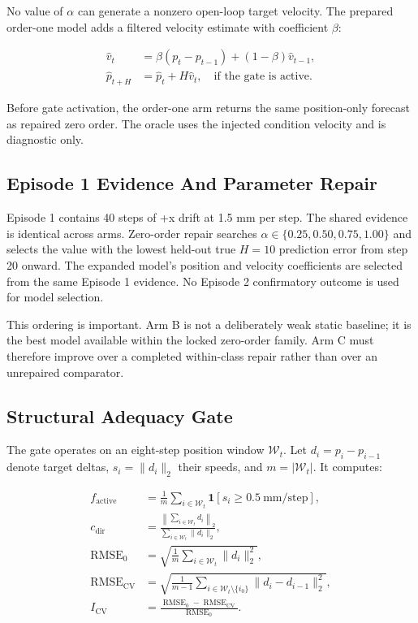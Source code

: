 \documentclass[10pt]{article}
\begin{document}
No value of \(\alpha\) can generate a nonzero open-loop target velocity. The prepared order-one model adds a filtered velocity estimate with coefficient \(\beta\):

\begin{align*}
\hat v_t &= \beta\left(p_t-p_{t-1}\right)
  +(1-\beta)\hat v_{t-1}, \\
\hat p_{t+H} &= \hat p_t + H\hat v_t,
  \quad \text{if the gate is active}.
\end{align*}

Before gate activation, the order-one arm returns the same position-only forecast as repaired zero order. The oracle uses the injected condition velocity and is diagnostic only.

\subsection{Episode 1 Evidence And Parameter Repair}

Episode 1 contains 40 steps of +x drift at 1.5 mm per step. The shared evidence is identical across arms. Zero-order repair searches \(\alpha \in \{0.25, 0.50, 0.75, 1.00\}\) and selects the value with the lowest held-out true \(H=10\) prediction error from step 20 onward. The expanded model's position and velocity coefficients are selected from the same Episode 1 evidence. No Episode 2 confirmatory outcome is used for model selection.

This ordering is important. Arm B is not a deliberately weak static baseline; it is the best model available within the locked zero-order family. Arm C must therefore improve over a completed within-class repair rather than over an unrepaired comparator.

\subsection{Structural Adequacy Gate}

The gate operates on an eight-step position window \(\mathcal{W}_t\). Let \(d_i=p_i-p_{i-1}\) denote target deltas, \(s_i=\lVert d_i\rVert_2\) their speeds, and \(m=\lvert\mathcal{W}_t\rvert\). It computes:

\begin{align*}
f_{\mathrm{active}}
  &= \frac{1}{m}\sum_{i\in\mathcal{W}_t}
     \mathbf{1}\!\left[s_i \ge 0.5\ \mathrm{mm/step}\right], \\
c_{\mathrm{dir}}
  &= \frac{\left\lVert\sum_{i\in\mathcal{W}_t}d_i\right\rVert_2}
          {\sum_{i\in\mathcal{W}_t}\lVert d_i\rVert_2}, \\
\operatorname{RMSE}_{0}
  &= \sqrt{\frac{1}{m}\sum_{i\in\mathcal{W}_t}\lVert d_i\rVert_2^2}, \\
\operatorname{RMSE}_{\mathrm{CV}}
  &= \sqrt{\frac{1}{m-1}\sum_{i\in\mathcal{W}_t\setminus\{i_0\}}
     \lVert d_i-d_{i-1}\rVert_2^2}, \\
I_{\mathrm{CV}}
  &= \frac{\operatorname{RMSE}_{0}-\operatorname{RMSE}_{\mathrm{CV}}}
          {\operatorname{RMSE}_{0}}.
\end{align*}
\end{document}
